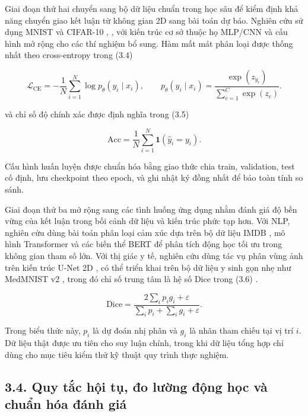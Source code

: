 \documentclass[a4paper,12pt]{article}
\begin{document}
Giai đoạn thứ hai chuyển sang bộ dữ liệu chuẩn trong học sâu để kiểm định khả năng chuyển giao kết luận từ không gian 2D sang bài toán dự báo. Nghiên cứu sử dụng MNIST và CIFAR-10 \cite{ref8}, \cite{ref9}, với kiến trúc cơ sở thuộc họ MLP/CNN và cấu hình mở rộng cho các thí nghiệm bổ sung. Hàm mất mát phân loại được thống nhất theo cross-entropy trong (3.4)

\begin{equation}
\mathcal{L}_{\mathrm{CE}}=-\frac{1}{N}\sum_{i=1}^N\log p_\theta(y_i\mid x_i),
\qquad
p_\theta(y_i\mid x_i)=\frac{\exp(z_{y_i})}{\sum_{c=1}^{C}\exp(z_c)}.\tag{3.4}
\end{equation}

và chỉ số độ chính xác được định nghĩa trong (3.5)

\begin{equation}
\mathrm{Acc}=\frac{1}{N}\sum_{i=1}^{N}\mathbf{1}(\hat y_i=y_i).\tag{3.5}
\end{equation}

Cấu hình huấn luyện được chuẩn hóa bằng giao thức chia train, validation, test cố định, lưu checkpoint theo epoch, và ghi nhật ký đồng nhất để bảo toàn tính so sánh.

Giai đoạn thứ ba mở rộng sang các tình huống ứng dụng nhằm đánh giá độ bền vững của kết luận trong bối cảnh dữ liệu và kiến trúc phức tạp hơn. Với NLP, nghiên cứu dùng bài toán phân loại cảm xúc dựa trên bộ dữ liệu IMDB \cite{ref10}, mô hình Transformer \cite{ref12} và các biến thể BERT \cite{ref13} để phân tích động học tối ưu trong không gian tham số lớn. Với thị giác y tế, nghiên cứu dùng tác vụ phân vùng ảnh trên kiến trúc U-Net 2D \cite{ref14}, có thể triển khai trên bộ dữ liệu y sinh gọn nhẹ như MedMNIST v2 \cite{ref11}, trong đó chỉ số trung tâm là hệ số Dice trong (3.6) \cite{ref15}.

\begin{equation}
\mathrm{Dice}=\frac{2\sum_i p_i g_i+\varepsilon}{\sum_i p_i+\sum_i g_i+\varepsilon}.\tag{3.6}
\end{equation}

Trong biểu thức này, $p_i$ là dự đoán nhị phân và $g_i$ là nhãn tham chiếu tại vị trí $i$. Dữ liệu thật được ưu tiên cho suy luận chính, trong khi dữ liệu tổng hợp chỉ dùng cho mục tiêu kiểm thử kỹ thuật quy trình thực nghiệm.

\subsection{3.4. Quy tắc hội tụ, đo lường động học và chuẩn hóa đánh giá}
\end{document}
